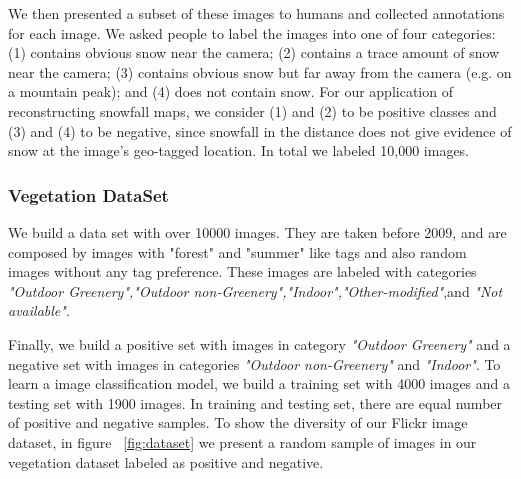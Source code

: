 \documentclass[10pt,journal,compsoc]{IEEEtran}
\begin{document}
We then presented a subset of these images to humans and collected
annotations for each image. We asked people to label
the images into one of four categories: (1) contains obvious
snow near the camera; (2) contains a trace amount of snow near
the camera; (3) contains obvious snow but far away from the
camera (e.g. on a mountain peak); and (4) does not contain snow. 
For our application of reconstructing snowfall maps, we consider (1)
and (2) to be positive classes and (3) and (4) to be negative,
since snowfall in the distance does not give evidence of snow
at the image's geo-tagged location. In total we labeled 10,000 images.

\subsubsection{Vegetation DataSet}


We build a data set with over 10000 images. They are taken before 2009, and are composed by images with "forest" and "summer" like tags and also random images without any tag preference. These images are labeled with categories 
\textit{"Outdoor Greenery","Outdoor non-Greenery","Indoor","Other-modified"},and \textit{"Not available"}.

Finally, we build a positive set with images in category \textit{"Outdoor Greenery"} and a negative set 
with images in categories \textit{"Outdoor non-Greenery"} and \textit{"Indoor"}. To learn a image classification model, we build a training set with 4000 images and a testing set with 1900 images. In training and testing set, there are equal number of positive and negative samples.
To show the diversity of our Flickr image dataset, in figure ~\ref{fig:dataset} we present a random sample of images in our vegetation dataset labeled as positive and negative.
\end{document}
